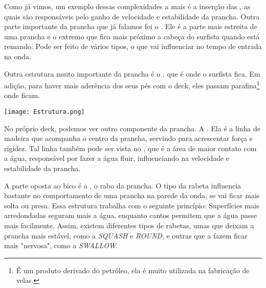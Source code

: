 \documentclass[book, 12pt, twoside, a5paper, english, brazil, sumario=tradicional, openany]{abntex2}
\begin{document}
{}

\vspace{-0.3cm}

Como já vimos, um exemplo dessas complexidades a mais é a inserção das {\color{celestialblue}{quilhas}}, as quais são responsáveis pelo ganho de velocidade e estabilidade da prancha. Outra parte importante da prancha que já falamos foi o {\color{celestialblue}{bico}}. Ele é a parte mais estreita de uma prancha e o extremo que fica mais próximo a  cabeça do surfista quando está remando. Pode ser feito de vários tipos, o que vai influenciar no tempo de entrada na onda.

{}

\vspace{-0.3cm}

Outra estrutura muito importante da prancha é o {\color{celestialblue}{deck}}, que é onde o surfista fica. Em adição, para haver mais aderência dos seus pés com o deck, eles passam parafina\footnote{É um produto derivado do petróleo, ela é muito utilizada na fabricação de velas.} onde ficam.

\begin{center}
    \texttt{[image: Estrutura.png]} 
\end{center}
\vspace{-0.23cm}

No próprio deck, podemos ver outro componente da prancha. A {\color{celestialblue}{longarina}}. Ela é a linha de madeira que acompanha o centro da prancha, servindo para acrescentar força e rigidez. Tal linha também pode ser vista no {\color{celestialblue}{fundo}}, que é a área de maior contato com a água, responsável por fazer a água fluir, influenciando na velocidade e estabilidade da prancha. 

A parte oposta ao bico é a {\color{celestialblue}{rabeta}}, o rabo da prancha. O tipo da rabeta influencia bastante no comportamento de uma prancha na parede da onda, se vai ficar mais solta ou presa. Essa estrutura trabalha com o seguinte princípio: Superfícies mais arredondadas seguram mais a água, enquanto cantos permitem que a água passe mais facilmente. Assim, existem diferentes tipos de rabetas, umas que deixam a prancha mais estável, como a \textit{SQUASH} e \textit{ROUND}, e outras que a fazem ficar mais "nervosa", como a \textit{SWALLOW}.
\end{document}

